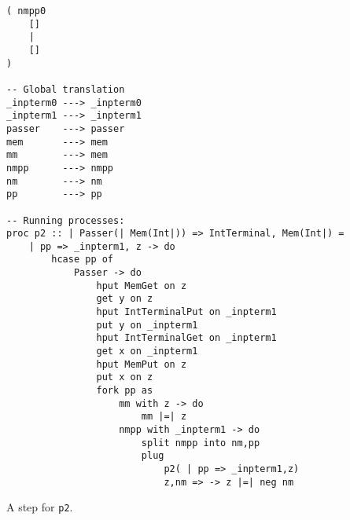\documentclass{article}
\theoremstyle{plain}%
\theoremstyle{definition}
\theoremstyle{remark}
\begin{document}
\begin{verbatim}
( nmpp0
    []
    |
    []
)

-- Global translation
_inpterm0 ---> _inpterm0 
_inpterm1 ---> _inpterm1 
passer    ---> passer 
mem       ---> mem
mm        ---> mem
nmpp      ---> nmpp
nm        ---> nm
pp        ---> pp

-- Running processes:
proc p2 :: | Passer(| Mem(Int|)) => IntTerminal, Mem(Int|) =
    | pp => _inpterm1, z -> do
        hcase pp of
            Passer -> do
                hput MemGet on z
                get y on z
                hput IntTerminalPut on _inpterm1
                put y on _inpterm1
                hput IntTerminalGet on _inpterm1
                get x on _inpterm1
                hput MemPut on z
                put x on z
                fork pp as
                    mm with z -> do
                        mm |=| z
                    nmpp with _inpterm1 -> do
                        split nmpp into nm,pp
                        plug
                            p2( | pp => _inpterm1,z)
                            z,nm => -> z |=| neg nm
\end{verbatim}
A step for \verb|p2|.
\end{document}
